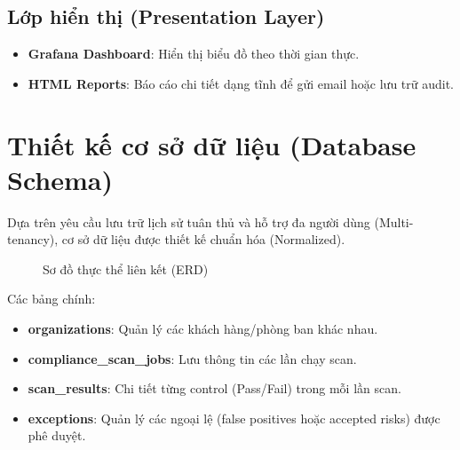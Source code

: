 \documentclass[12pt,a4paper]{report}
\begin{document}
\subsection{Lớp hiển thị (Presentation Layer)}
\begin{itemize}
    \item \textbf{Grafana Dashboard}: Hiển thị biểu đồ theo thời gian thực.
    \item \textbf{HTML Reports}: Báo cáo chi tiết dạng tĩnh để gửi email hoặc lưu trữ audit.
\end{itemize}

\section{Thiết kế cơ sở dữ liệu (Database Schema)}
Dựa trên yêu cầu lưu trữ lịch sử tuân thủ và hỗ trợ đa người dùng (Multi-tenancy), cơ sở dữ liệu được thiết kế chuẩn hóa (Normalized).

\begin{figure}[H]
    \centering
    \caption{Sơ đồ thực thể liên kết (ERD)}
    \label{fig:erd}
\end{figure}

Các bảng chính:
\begin{itemize}
    \item \textbf{organizations}: Quản lý các khách hàng/phòng ban khác nhau.
    \item \textbf{compliance\_scan\_jobs}: Lưu thông tin các lần chạy scan.
    \item \textbf{scan\_results}: Chi tiết từng control (Pass/Fail) trong mỗi lần scan.
    \item \textbf{exceptions}: Quản lý các ngoại lệ (false positives hoặc accepted risks) được phê duyệt.
\end{itemize}
\end{document}
